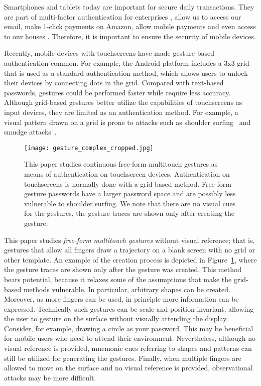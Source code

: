 \documentclass{sig-alternate-10pt}
\begin{document}
Smartphones and tablets today are important for secure daily transactions. They are part of multi-factor authentication for enterprises \cite{azuremultifactor}, allow us to access our email, make 1-click payments on Amazon, allow mobile payments \cite{square} and even access to our houses \cite{gogogate}. Therefore, it is important to ensure the security of mobile devices. 

Recently, mobile devices with touchscreens have made gesture-based authentication common. For example, the Android platform includes a 3x3 grid that is used as a standard authentication method, which allows users to unlock their devices by connecting dots in the grid. Compared with text-based passwords, gestures could be performed faster while require less accuracy.
Although grid-based gestures better utilize the capabilities of touchscreens as input devices, they are limited as an authentication method. For example, a visual pattern drawn on a grid is prone to attacks such as shoulder surfing~\cite{Zakaria:2011:SSD:2078827.2078835} and smudge attacks~\cite{Aviv:2010:SAS:1925004.1925009}.



\begin{figure}[t!]
\centering
\texttt{[image: gesture\_complex\_cropped.jpg]}
\caption{This paper studies continuous free-form multitouch gestures as means of authentication on touchscreen devices. Authentication on touchscreens is normally done with a grid-based method. Free-form gesture passwords have a larger password space and are possibly less vulnerable to shoulder surfing. We note that there are no visual cues for the gestures, the gesture traces are shown only after creating the gesture.}
\label{fig:example_photo}
\end{figure}



This paper studies \emph{free-form multitouch gestures} without visual reference; that is, gestures that allow all fingers draw a trajectory on a blank screen with no grid or other template. An example of the
creation process is depicted in Figure~\ref{fig:example_photo}, where the gesture traces are shown only after the gesture was created.
This method bears potential, because it relaxes some of the assumptions that make the grid-based methods vulnerable. 
In particular, arbitrary shapes can be created.
Moreover, as more fingers can be used,  in principle more information can be expressed.
Technically such gestures can be scale and position invariant, allowing the user to gesture on the surface without visually attending the display. Consider, for example, drawing a circle as your password.
This may be beneficial for mobile users who need to attend their environment.
Nevertheless, although no visual reference is provided, mnemonic cues referring to shapes and patterns can still be utilized for generating the gestures. 
Finally, when multiple fingers are allowed to move on the surface and no visual reference is provided,  observational attacks may be more difficult.
\end{document}
